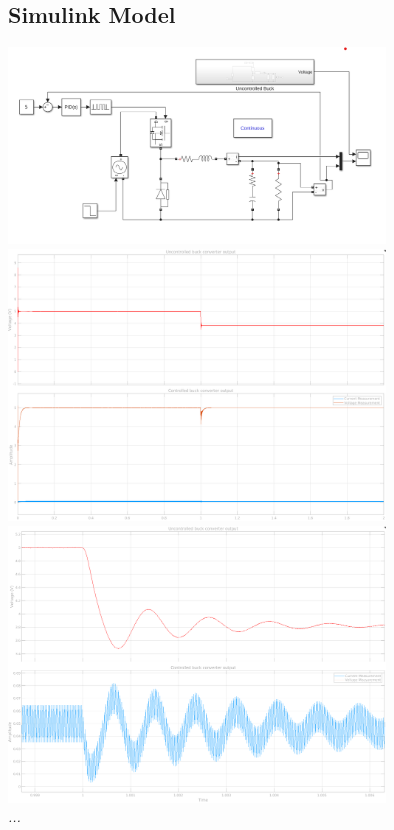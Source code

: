 \documentclass[11pt]{article}
\begin{document}
\begin{preview}
    \section{Simulink Model}
    \begin{center}
        \includegraphics[width=0.75\textwidth]{img/sim.png}\\
        \includegraphics[width=0.75\textwidth]{img/uncontrolled v controlled.png}\\
        \includegraphics[width=0.75\textwidth]{img/step_zoom.png}\\
        \textit{...}
    \end{center}
    

\end{preview}
\end{document}
